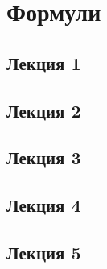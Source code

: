 \documentclass[fleqn, 12pt]{article}
\theoremstyle{definition}
\begin{document}
\newpage
\section{Формули}

\subsection{Лекция 1}

\subsection{Лекция 2}

\subsection{Лекция 3}

\subsection{Лекция 4}

\subsection{Лекция 5}
\end{document}
